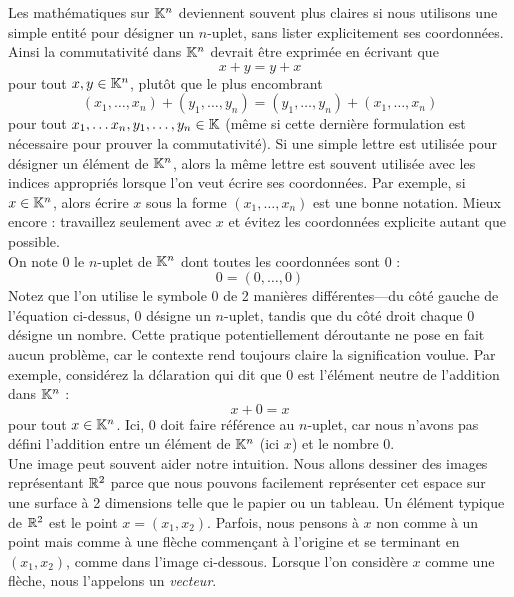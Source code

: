 \documentclass[12pt]{book}
\theoremstyle{plain}
\begin{document}
\indent
Les mathématiques sur $\mathbb{K}^n$ deviennent souvent plus claires si nous utilisons une simple entité pour désigner un $n$-uplet, sans lister explicitement ses coordonnées. Ainsi la commutativité dans $\mathbb{K}^n$ devrait être exprimée en écrivant que
\begin{equation*}
    x+y=y+x
\end{equation*}
pour tout $x,y\in\mathbb{K}^n$, plutôt que le plus encombrant
\begin{equation*}
    (x_1,\ldots,x_n)+(y_1,\ldots,y_n)=(y_1,\ldots,y_n)+(x_1,\ldots,x_n)
\end{equation*}
pour tout $x_1,\ldots x_n,y_1,\ldots,y_n\in\mathbb{K}$ (même si cette dernière formulation est nécessaire pour prouver la commutativité). Si une simple lettre est utilisée pour désigner un élément de $\mathbb{K}^n$, alors la même lettre est souvent utilisée avec les indices appropriés lorsque l'on veut écrire ses coordonnées. Par exemple, si $x\in\mathbb{K}^n$, alors écrire $x$ sous la forme $(x_1,\ldots,x_n)$ est une bonne notation. Mieux encore : travaillez seulement avec $x$ et évitez les coordonnées explicite autant que possible.\\
\indent
On note 0 le $n$-uplet de $\mathbb{K}^n$ dont toutes les coordonnées sont 0 :
\begin{equation*}
    0=(0,\ldots,0)
\end{equation*}
Notez que l'on utilise le symbole 0 de 2 manières différentes---du côté gauche de l’équation ci-dessus, 0 désigne un $n$-uplet, tandis que du côté droit chaque 0 désigne un nombre. Cette pratique potentiellement déroutante ne pose en fait aucun problème, car le contexte rend toujours claire la signification voulue. Par exemple, considérez la d\'claration qui dit que 0 est l'élément neutre de l'addition dans $\mathbb{K}^n$ :
\begin{equation*}
    x+0=x
\end{equation*}
pour tout $x\in\mathbb{K}^n$. Ici, 0 doit faire référence au $n$-uplet, car nous n'avons pas défini l'addition entre un élément de $\mathbb{K}^n$ (ici $x$) et le nombre 0.\\
\indent
Une image peut souvent aider notre intuition. Nous allons dessiner des images représentant $\mathbb{R}^2$ parce que nous pouvons facilement représenter cet espace sur une surface à 2 dimensions telle que le papier ou un tableau. Un élément typique de $\mathbb{R}^2$ est le point $x=(x_1,x_2)$. Parfois, nous pensons à $x$ non comme à un point mais comme à une flèche commençant à l'origine et se terminant en $(x_1,x_2)$, comme dans l'image ci-dessous. Lorsque l'on considère $x$ comme une flèche, nous l'appelons un \textit{vecteur}.
\end{document}
